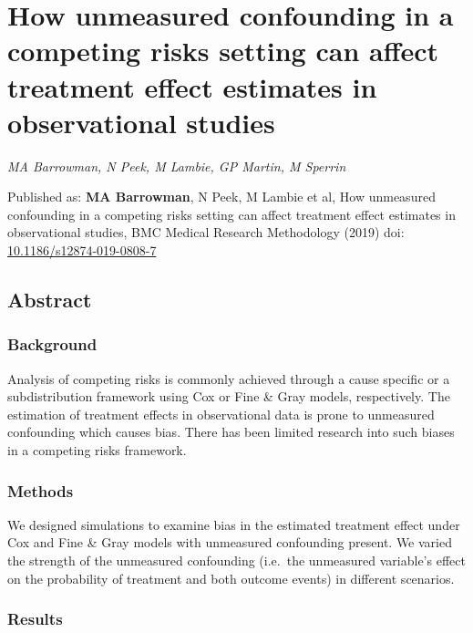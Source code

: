 \documentclass[12pt,PhD,twoside,openright]{muthesis}
\begin{document}
\hypertarget{chap-Conf-CR}{%
\chapter{How unmeasured confounding in a competing risks setting can affect treatment effect estimates in observational studies}\label{chap-Conf-CR}}

\emph{MA Barrowman, N Peek, M Lambie, GP Martin, M Sperrin}

Published as: \textbf{MA Barrowman}, N Peek, M Lambie et al, How unmeasured confounding in a competing risks setting can affect treatment effect estimates in observational studies, BMC Medical Research Methodology (2019) doi: \href{https://doi.org/10.1186/s12874-019-0808-7}{10.1186/s12874-019-0808-7}

\hypertarget{abstract}{%
\section*{Abstract}\label{abstract}}

\hypertarget{background}{%
\subsection{Background}\label{background}}

Analysis of competing risks is commonly achieved through a cause specific or a subdistribution framework using Cox or Fine \& Gray models, respectively. The estimation of treatment effects in observational data is prone to unmeasured confounding which causes bias. There has been limited research into such biases in a competing risks framework.

\hypertarget{methods-1}{%
\subsection{Methods}\label{methods-1}}

We designed simulations to examine bias in the estimated treatment effect under Cox and Fine \& Gray models with unmeasured confounding present. We varied the strength of the unmeasured confounding (i.e.~the unmeasured variable's effect on the probability of treatment and both outcome events) in different scenarios.

\hypertarget{results}{%
\subsection{Results}\label{results}}
\end{document}
